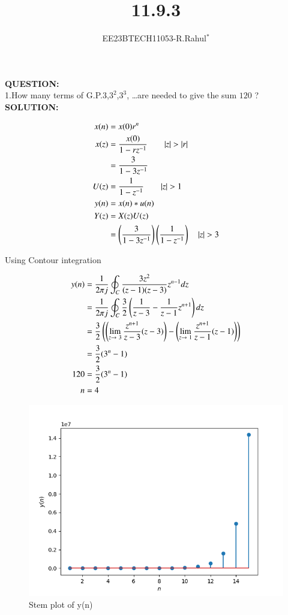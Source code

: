 \documentclass[journal,12pt,twocolumn]{IEEEtran}
\theoremstyle{remark}
\begin{document}

\vspace{3cm}
\title{\textbf{11.9.3}}
\author{EE23BTECH11053-R.Rahul$^{*}$%
}
\maketitle
\newpage
\bigskip

\textbf{QUESTION:}\\
1.How many terms of G.P.$3$,$3^2$,$3^3$, \ldots are needed to give the sum $120$ ?\\

\textbf{SOLUTION:}\\
\vspace{-0.25cm}

\begin{center}
    
\begin{align}
      x(n)&=x(0)r^{n}\\
      x(z)&=\frac{x(0)}{1-rz^{-1}} \qquad |z|>|r|\\
      &=\frac{3}{1-3z^{-1}}\\
      U(z)&=\frac{1}{1-z^{-1}} \qquad |z|>1\\
      y(n)&= x(n)*u(n)\\
      Y(z)&=X(z)U(z)\\
&=\brak{ \frac{3}{1-3z^{-1}}}\brak{\frac{1}{1-z^{-1}}}\quad|z| > 3 \end{align}
\end{center}
Using Contour integration\\
\begin{center}
 \begin{align}
   y(n)&=\frac{1}{2\pi j}\oint_C \frac{3 z^2}{(z-1)(z-3)}z^{n-1} dz\\
   &=\frac{1}{2 \pi j}\oint_C \frac{3}{2} \left(\frac{1}{z-3} - \frac{1}{z-1}z^{n+1}\right)dz\\
   &= \frac{3}{2} \left(\left(\lim_{z\to \ 3}\frac{z^{n+1}}{z-3} (z-3)\right)-\left(\lim_{z \to \ 1}\frac{z^{n+1}}{z-1} (z-1)\right)\right)\\
   &= \frac{3}{2}(3^{n}- 1)\\
   120&= \frac{3}{2}(3^{n}- 1)\\
   n&=4
 \end{align}
\end{center}

\begin{figure}[h]
  
  \includegraphics[width=\columnwidth]{figs/download.png}
  \caption{Stem plot of y(n)}
  \label{fig:your_label}
\end{figure}
\end{document}

